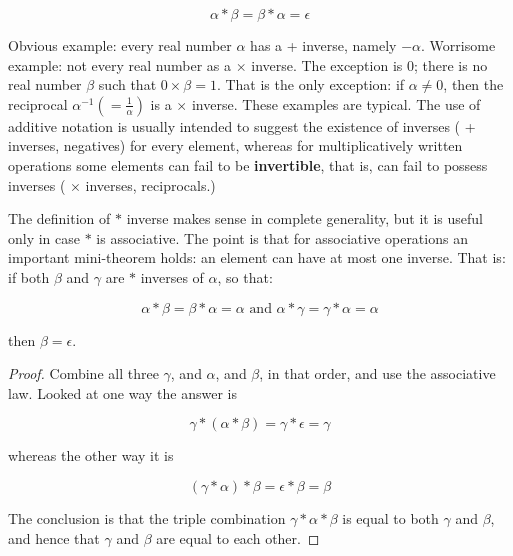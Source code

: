 \begin{equation}
    \alpha \ast \beta = \beta \ast \alpha = \epsilon
\end{equation}

Obvious example: every real number $\alpha$ has a + inverse, namely $-\alpha$. Worrisome example: not every real number as a $\times$ inverse. The exception is 0; there is no real number $\beta$ such that $0 \times \beta = 1$. That is the only exception: if $\alpha \neq 0$, then the reciprocal $\alpha^{-1} (= \frac{1}{\alpha})$ is a $\times$ inverse. These examples are typical. The use of additive notation is usually intended to suggest the existence of inverses ( + inverses, negatives) for every element, whereas for multiplicatively written operations some elements can fail to be \textbf{invertible}, that is, can fail to possess inverses ( $\times$ inverses, reciprocals.)

The definition of $\ast$ inverse makes sense in complete generality, but it is useful only in case $\ast$ is associative. The point is that for associative operations an important mini-theorem holds: an element can have at most one inverse. That is: if both $\beta$ and $\gamma$ are $\ast$ inverses of $\alpha$, so that:

\begin{equation}
    \alpha \ast \beta = \beta \ast \alpha = \alpha \text{ and } \alpha \ast \gamma = \gamma \ast \alpha = \alpha
\end{equation}

then $\beta = \epsilon$.

\begin{proof}
    Combine all three $\gamma$, and $\alpha$, and $\beta$, in that order, and use the associative law. Looked at one way the answer is

    \begin{equation}
        \gamma \ast (\alpha \ast \beta) = \gamma \ast \epsilon = \gamma
    \end{equation}

    whereas the other way it is

    \begin{equation}
        (\gamma \ast \alpha) \ast \beta = \epsilon \ast \beta = \beta
    \end{equation}

    The conclusion is that the triple combination $\gamma \ast \alpha \ast \beta$ is equal to both $\gamma$ and $\beta$, and hence that $\gamma$ and $\beta$ are equal to each other.
\end{proof}

